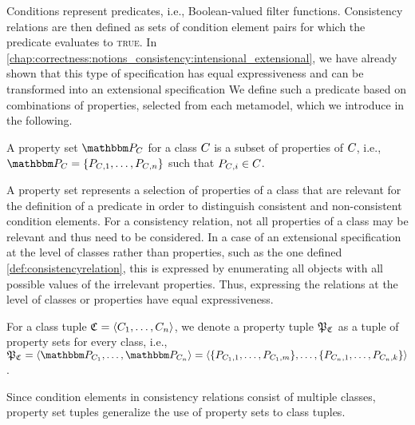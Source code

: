 Conditions represent predicates, i.e., Boolean-valued filter functions.
Consistency relations are then defined as sets of condition element pairs for which the predicate evaluates to \textsc{true}.
In \autoref{chap:correctness:notions_consistency:intensional_extensional}, we have already shown that this type of specification has equal expressiveness and can be transformed into an extensional specification
We define such a predicate based on combinations of properties, selected from each metamodel, which we introduce in the following.

\begin{definition}
A property set $\propertyset{P}{\class{C}{}}$ for a class $\class{C}{}$ is a subset of properties of $\class{C}{}$, i.e., $\propertyset{P}{\class{C}{}} = \setted{P_{\class{C}{}, 1}, \dots, P_{\class{C}{}, n}}$ such that $P_{\class{C}{}, i} \in \class{C}{}$.
\end{definition}

A property set represents a selection of properties of a class that are relevant for the definition of a predicate in order to distinguish consistent and non-consistent condition elements. For a consistency relation, not all properties of a class may be relevant and thus need to be considered. In a case of an extensional specification at the level of classes rather than properties, such as the one defined \autoref{def:consistencyrelation}, this is expressed by enumerating all objects with all possible values of the irrelevant properties. Thus, expressing the relations at the level of classes or properties have equal expressiveness.

\begin{definition}
For a class tuple $\classtuple{C}{} = \tupled{\class{C}{1}, \dots, \class{C}{n}}$, we denote a property tuple $\propertysettuple{P}{\classtuple{C}{}}$ as a tuple of property sets for every class, i.e., $\propertysettuple{P}{\classtuple{C}{}} = \tupled{\propertyset{P}{\class{C}{1}}, \dots, \propertyset{P}{\class{C}{n}}} = \tupled{\setted{P_{\class{C}{1}, 1}, \dots, P_{\class{C}{1}, m}}, \dots, \setted{P_{\class{C}{n}, 1}, \dots, P_{\class{C}{n}, k}}}$.
\end{definition}

Since condition elements in consistency relations consist of multiple classes, property set tuples generalize the use of property sets to class tuples.

